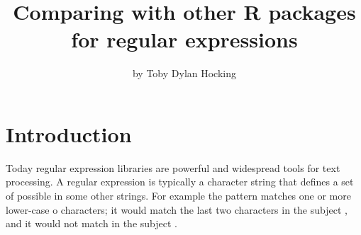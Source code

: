 \newcommand{\sectiontidyr}{Comparing \code{namedCapture::df\_match\_variable} with \code{tidyr::extract}}
\newcommand{\sectiontrackDb}{Extract all matches from a multi-line text file via \code{str\_match\_all\_variable}}
\newcommand{\sectiontimings}{Comparing computation times of R regex packages}
\newcommand{\sectiondf}{\code{df\_match\_variable} extracts new columns from character columns in a data.frame}
\newcommand{\sectionrex}{Comparing \CRANpkg{namedCapture} variable argument syntax with \CRANpkg{rex}}

\title{Comparing  with other R packages for 
  regular expressions}

\author{by Toby Dylan Hocking}

\maketitle


\section{Introduction}

Today regular expression libraries are powerful and widespread tools
for text processing. A regular expression  is
typically a character string that defines a set of possible
 in some other  strings. For example
the pattern  matches one or more lower-case o characters; it
would match the last two characters in the subject , and it
would not match in the subject . 

